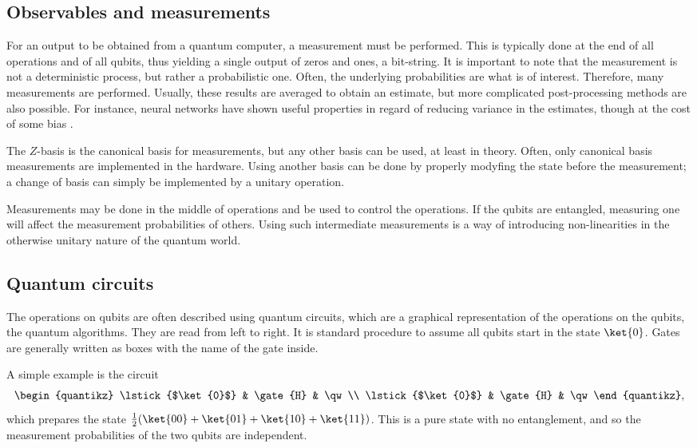 \subsection{Observables and measurements}
For an output to be obtained from a quantum computer, a measurement must be performed.
This is typically done at the end of all operations and of all qubits, thus yielding a single output of zeros and ones, a bit-string.
It is important to note that the measurement is not a deterministic process, but rather a probabilistic one.
Often, the underlying probabilities are what is of interest.
Therefore, many measurements are performed.
Usually, these results are averaged to obtain an estimate, but more complicated post-processing methods are also possible.
For instance, neural networks have shown useful properties in regard of reducing variance in the estimates, though at the cost of some bias \cite{torlai2020}.

The $Z$-basis is the canonical basis for measurements, but any other basis can be used, at least in theory.
Often, only canonical basis measurements are implemented in the hardware.
Using another basis can be done by properly modyfing the state before the measurement; a change of basis can simply be implemented by a unitary operation.

Measurements may be done in the middle of operations and be used to control the operations.
If the qubits are entangled, measuring one will affect the measurement probabilities of others.
Using such intermediate measurements is a way of introducing non-linearities in the otherwise unitary nature of the quantum world.


\subsection{Quantum circuits}
The operations on qubits are often described using quantum circuits, which are a graphical representation of the operations on the qubits, the quantum algorithms.
They are read from left to right.
It is standard procedure to assume all qubits start in the state $\ket{0}$.
Gates are generally written as boxes with the name of the gate inside.

A simple example is the circuit
\begin{equation}
    \begin{quantikz}
        \lstick{$\ket{0}$} & \gate{H} & \qw \\
        \lstick{$\ket{0}$} & \gate{H} & \qw
    \end{quantikz},
\end{equation}
which prepares the state $\frac{1}{2}(\ket{00} + \ket{01} + \ket{10} + \ket{11})$.
This is a pure state with no entanglement, and so the measurement probabilities of the two qubits are independent.

